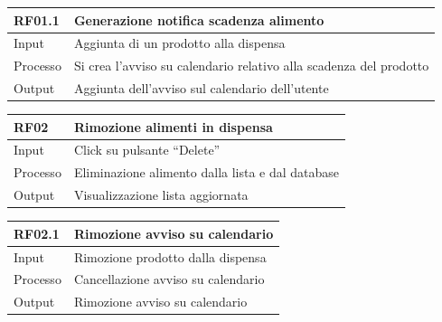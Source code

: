 \documentclass{article}
\begin{document}
\begin{table}[H]
    \begin{flushleft}
      \begin{tabular}{l|l}
        \toprule
        \textbf{RF01.1} & \textbf{Generazione notifica scadenza alimento}\\
        \midrule
        Input & Aggiunta di un prodotto alla dispensa\\
        Processo & Si crea l’avviso su calendario relativo alla scadenza del prodotto\\
        Output & Aggiunta dell’avviso sul calendario dell’utente\\
        \bottomrule
      \end{tabular}
    \end{flushleft}
\end{table}

\begin{table}[H]
    \begin{flushleft}
      \begin{tabular}{l|l}
        \toprule
        \textbf{RF02} & \textbf{Rimozione alimenti in dispensa}\\
        \midrule
        Input & Click su pulsante “Delete”\\
        Processo & Eliminazione alimento dalla lista e dal database\\
        Output & Visualizzazione lista aggiornata\\
        \bottomrule
      \end{tabular}
    \end{flushleft}
\end{table}

\begin{table}[H]
    \begin{flushleft}
      \begin{tabular}{l|l}
        \toprule
        \textbf{RF02.1} & \textbf{Rimozione avviso su calendario}\\
        \midrule
        Input & Rimozione prodotto dalla dispensa\\
        Processo & Cancellazione avviso su calendario\\
        Output & Rimozione avviso su calendario\\
        \bottomrule
      \end{tabular}
    \end{flushleft}
\end{table}
\end{document}
